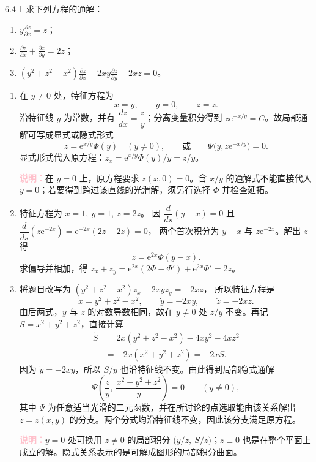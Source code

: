 \documentclass[UTF8,a4paper,11pt]{ctexart}
\newcommand{\e}{\mathrm e}
\newcommand{\note}[1]{\par\smallskip\noindent\textcolor{pink}{\bfseries 说明：}#1\par\smallskip}
\begin{document}
\begin{problem}{6.4-1}
求下列方程的通解：
\begin{enumerate}[label=(\arabic*)]
\item $\displaystyle y\frac{\partial z}{\partial x}=z$；
\item $\displaystyle
\frac{\partial z}{\partial x}
+\frac{\partial z}{\partial y}=2z$；
\item $\displaystyle
(y^2+z^2-x^2)\frac{\partial z}{\partial x}
-2xy\frac{\partial z}{\partial y}+2xz=0$。
\end{enumerate}
\end{problem}
\begin{solution}
\begin{enumerate}[label=(\arabic*)]
\item 在 $y\ne0$ 处，特征方程为
\[
\dot x=y,\qquad \dot y=0,\qquad \dot z=z.
\]
沿特征线 $y$ 为常数，并有
$\dfrac{dz}{dx}=\dfrac{z}{y}$；分离变量积分得到
$z\e^{-x/y}=C$。故局部通解可写成显式或隐式形式
\[
\boxed{z=\e^{x/y}\Phi(y)\quad(y\ne0),}
\qquad\text{或}\qquad
\Psi\bigl(y,z\e^{-x/y}\bigr)=0.
\]
显式形式代入原方程：$z_x=\e^{x/y}\Phi(y)/y=z/y$。
\note{在 $y=0$ 上，原方程要求 $z(x,0)=0$。含 $x/y$ 的通解式不能直接代入 $y=0$；若要得到跨过该直线的光滑解，须另行选择 $\Phi$ 并检查延拓。}

\item 特征方程为
$\dot x=1,\ \dot y=1,\ \dot z=2z$。
因 $\dfrac{d}{ds}(y-x)=0$ 且
$\dfrac{d}{ds}(z\e^{-2x})
=\e^{-2x}(2z-2z)=0$，
两个首次积分为 $y-x$ 与 $z\e^{-2x}$。解出 $z$ 得
\[
\boxed{z=\e^{2x}\Phi(y-x).}
\]
求偏导并相加，得
$z_x+z_y
=\e^{2x}(2\Phi-\Phi')+\e^{2x}\Phi'
=2z$。

\item 将题目改写为
$(y^2+z^2-x^2)z_x-2xyz_y=-2xz$，
所以特征方程是
\[
\dot x=y^2+z^2-x^2,\qquad
\dot y=-2xy,\qquad
\dot z=-2xz.
\]
由后两式，$y$ 与 $z$ 的对数导数相同，故在 $y\ne0$ 处 $z/y$ 不变。再记 $S=x^2+y^2+z^2$，直接计算
\[
\begin{aligned}
\dot S
&=2x(y^2+z^2-x^2)-4xy^2-4xz^2\\
&=-2x(x^2+y^2+z^2)=-2xS.
\end{aligned}
\]
因为 $\dot y=-2xy$，所以 $S/y$ 也沿特征线不变。由此得到局部隐式通解
\[
\boxed{\Psi\!\left(
\frac{z}{y},\ \frac{x^2+y^2+z^2}{y}
\right)=0\qquad(y\ne0),}
\]
其中 $\Psi$ 为任意适当光滑的二元函数，并在所讨论的点选取能由该关系解出 $z=z(x,y)$ 的分支。两个分式均沿特征线不变，因此该分支满足原方程。
\note{$y=0$ 处可换用 $z\ne0$ 的局部积分 $\bigl(y/z,\ S/z\bigr)$；$z\equiv0$ 也是在整个平面上成立的解。隐式关系表示的是可解成图形的局部积分曲面。}
\end{enumerate}
\end{solution}
\end{document}
